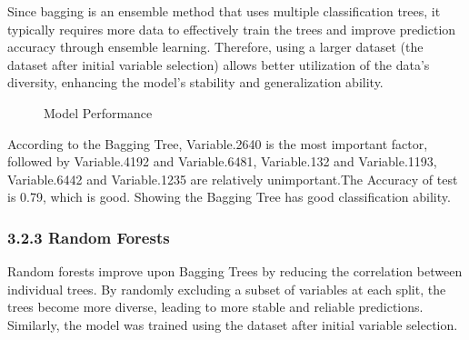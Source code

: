 \documentclass[
  12pt,
  letterpaper,
  DIV=11,
  numbers=noendperiod]{scrartcl}
\begin{document}
Since bagging is an ensemble method that uses multiple classification
trees, it typically requires more data to effectively train the trees
and improve prediction accuracy through ensemble learning. Therefore,
using a larger dataset (the dataset after initial variable selection)
allows better utilization of the data's diversity, enhancing the model's
stability and generalization ability.

\begin{figure}


\caption{\label{fig-tree5}Model Performance}

\end{figure}%

According to the Bagging Tree, Variable.2640 is the most important
factor, followed by Variable.4192 and Variable.6481, Variable.132 and
Variable.1193, Variable.6442 and Variable.1235 are relatively
unimportant.The Accuracy of test is 0.79, which is good. Showing the
Bagging Tree has good classification ability.

\subsubsection{3.2.3 Random Forests}\label{random-forests}

Random forests improve upon Bagging Trees by reducing the correlation
between individual trees. By randomly excluding a subset of variables at
each split, the trees become more diverse, leading to more stable and
reliable predictions. Similarly, the model was trained using the dataset
after initial variable selection.
\end{document}
